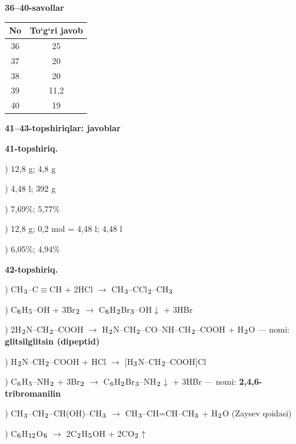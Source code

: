 \documentclass[11pt,a4paper]{article}
\renewcommand{\textsubscript}[1]{\ensuremath{_{\text{\fontsize{8}{8}\selectfont #1}}}}
\begin{document}
\noindent\textbf{36--40-savollar}\par\smallskip
\noindent\begin{tabular}{|c|c|}\hline \textbf{No} & \textbf{To`g`ri javob}\\\hline
36 & 25\\\hline
37 & 20\\\hline
38 & 20\\\hline
39 & 11,2\\\hline
40 & 19\\\hline
\end{tabular}\par\medskip
\noindent\textbf{41--43-topshiriqlar: javoblar}\par\smallskip
\noindent\textbf{41-topshiriq.}\par
{}) 12,8 g; 4,8 g\par
{}) 4,48 l; 392 g\par
{}) 7,69\%; 5,77\%\par
{}) 12,8 g; 0,2 mol = 4,48 l; 4,48 l\par
{}) 6,05\%; 4,94\%\par
\noindent\textbf{42-topshiriq.}\par
{}) CH\textsubscript{3}--C$\equiv$CH + 2HCl $\to$ CH\textsubscript{3}--CCl\textsubscript{2}--CH\textsubscript{3}\par
{}) C\textsubscript{6}H\textsubscript{5}--OH + 3Br\textsubscript{2} $\to$ C\textsubscript{6}H\textsubscript{2}Br\textsubscript{3}--OH$\downarrow$ + 3HBr\par
{}) 2H\textsubscript{2}N--CH\textsubscript{2}--COOH $\to$ H\textsubscript{2}N--CH\textsubscript{2}--CO--NH--CH\textsubscript{2}--COOH + H\textsubscript{2}O --- nomi: \textbf{glitsilglitsin (dipeptid)}\par
{}) H\textsubscript{2}N--CH\textsubscript{2}--COOH + HCl $\to$ [H\textsubscript{3}N--CH\textsubscript{2}--COOH]Cl\par
{}) C\textsubscript{6}H\textsubscript{5}--NH\textsubscript{2} + 3Br\textsubscript{2} $\to$ C\textsubscript{6}H\textsubscript{2}Br\textsubscript{3}--NH\textsubscript{2}$\downarrow$ + 3HBr --- nomi: \textbf{2,4,6-tribromanilin}\par
{}) CH\textsubscript{3}--CH\textsubscript{2}--CH(OH)--CH\textsubscript{3} $\to$ CH\textsubscript{3}--CH=CH--CH\textsubscript{3} + H\textsubscript{2}O (Zaysev qoidasi)\par
{}) C\textsubscript{6}H\textsubscript{12}O\textsubscript{6} $\to$ 2C\textsubscript{2}H\textsubscript{5}OH + 2CO\textsubscript{2}$\uparrow$\par
\end{document}

